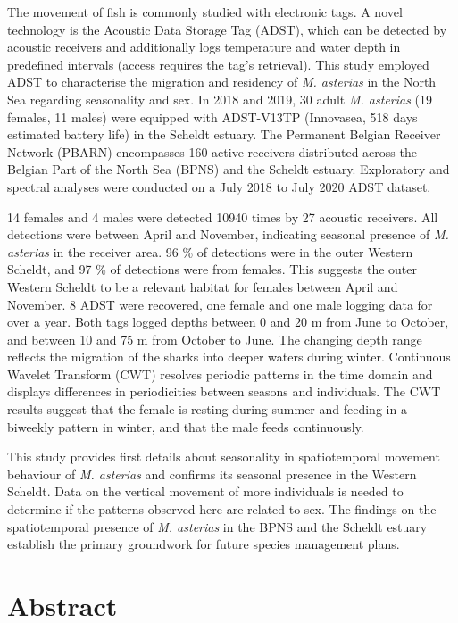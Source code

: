 \documentclass[
  authoryear,
  review,
  3p]{elsarticle}
\begin{document}
The movement of fish is commonly studied with electronic tags. A novel
technology is the Acoustic Data Storage Tag (ADST), which can be
detected by acoustic receivers and additionally logs temperature and
water depth in predefined intervals (access requires the tag's
retrieval). This study employed ADST to characterise the migration and
residency of \emph{M. asterias} in the North Sea regarding seasonality
and sex. In 2018 and 2019, 30 adult \emph{M. asterias} (19 females, 11
males) were equipped with ADST-V13TP (Innovasea, 518 days estimated
battery life) in the Scheldt estuary. The Permanent Belgian Receiver
Network (PBARN) encompasses 160 active receivers distributed across the
Belgian Part of the North Sea (BPNS) and the Scheldt estuary.
Exploratory and spectral analyses were conducted on a July 2018 to July
2020 ADST dataset.

14 females and 4 males were detected 10940 times by 27 acoustic
receivers. All detections were between April and November, indicating
seasonal presence of \emph{M. asterias} in the receiver area. 96 \% of
detections were in the outer Western Scheldt, and 97 \% of detections
were from females. This suggests the outer Western Scheldt to be a
relevant habitat for females between April and November. 8 ADST were
recovered, one female and one male logging data for over a year. Both
tags logged depths between 0 and 20 m from June to October, and between
10 and 75 m from October to June. The changing depth range reflects the
migration of the sharks into deeper waters during winter. Continuous
Wavelet Transform (CWT) resolves periodic patterns in the time domain
and displays differences in periodicities between seasons and
individuals. The CWT results suggest that the female is resting during
summer and feeding in a biweekly pattern in winter, and that the male
feeds continuously.

This study provides first details about seasonality in spatiotemporal
movement behaviour of \emph{M. asterias} and confirms its seasonal
presence in the Western Scheldt. Data on the vertical movement of more
individuals is needed to determine if the patterns observed here are
related to sex. The findings on the spatiotemporal presence of \emph{M.
asterias} in the BPNS and the Scheldt estuary establish the primary
groundwork for future species management plans.

\newpage{}

\hypertarget{abstract}{%
\section*{Abstract}\label{abstract}}
\end{document}
